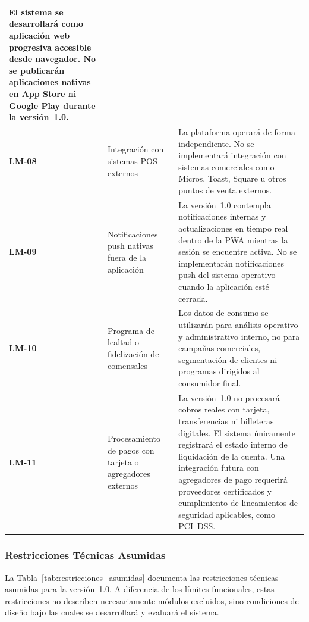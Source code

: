 {\begin{longtable}{>{\bfseries\centering}p{1.5cm} p{4.5cm} p{8cm}}
  El sistema se desarrollará como aplicación web progresiva accesible desde navegador. No se publicarán aplicaciones nativas en App Store ni Google Play durante la versión~1.0. \\
\rowcolor{altrow}
LM-08 & Integración con sistemas POS externos &
  La plataforma operará de forma independiente. No se implementará integración con sistemas comerciales como Micros, Toast, Square u otros puntos de venta externos. \\
LM-09 & Notificaciones push nativas fuera de la aplicación &
  La versión~1.0 contempla notificaciones internas y actualizaciones en tiempo real dentro de la PWA mientras la sesión se encuentre activa. No se implementarán notificaciones push del sistema operativo cuando la aplicación esté cerrada. \\
\rowcolor{altrow}
LM-10 & Programa de lealtad o fidelización de comensales &
  Los datos de consumo se utilizarán para análisis operativo y administrativo interno, no para campañas comerciales, segmentación de clientes ni programas dirigidos al consumidor final. \\
LM-11 & Procesamiento de pagos con tarjeta o agregadores externos &
  La versión~1.0 no procesará cobros reales con tarjeta, transferencias ni billeteras digitales. El sistema únicamente registrará el estado interno de liquidación de la cuenta. Una integración futura con agregadores de pago requerirá proveedores certificados y cumplimiento de lineamientos de seguridad aplicables, como PCI~DSS. \\
\end{longtable}
}

\newpage

\subsubsection{Restricciones Técnicas Asumidas}

La Tabla~\ref{tab:restricciones_asumidas} documenta las restricciones técnicas asumidas para
la versión~1.0. A diferencia de los límites funcionales, estas restricciones no describen
necesariamente módulos excluidos, sino condiciones de diseño bajo las cuales se desarrollará
y evaluará el sistema.

